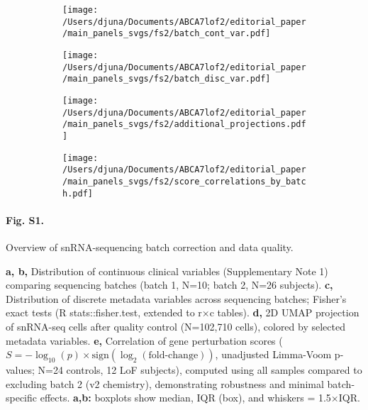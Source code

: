 % 
% 
\begin{figure}[H]
    \begin{subfigure}[t]{\textwidth}
        \caption{}
        \texttt{[image: /Users/djuna/Documents/ABCA7lof2/editorial\_paper/main\_panels\_svgs/fs2/batch\_cont\_var.pdf]}        
    \end{subfigure}
    \begin{subfigure}[t]{\textwidth}
        \caption{}
        \texttt{[image: /Users/djuna/Documents/ABCA7lof2/editorial\_paper/main\_panels\_svgs/fs2/batch\_disc\_var.pdf]}        
    \end{subfigure}  
    \begin{subfigure}[t]{\textwidth}
        \caption{}
        \texttt{[image: /Users/djuna/Documents/ABCA7lof2/editorial\_paper/main\_panels\_svgs/fs2/additional\_projections.pdf]}        
    \end{subfigure}   
    \begin{subfigure}[t]{\textwidth}
        \caption{}
        \texttt{[image: /Users/djuna/Documents/ABCA7lof2/editorial\_paper/main\_panels\_svgs/fs2/score\_correlations\_by\_batch.pdf]}        
    \end{subfigure}   
\end{figure}
\paragraph*{Fig. S1.} Overview of snRNA-sequencing batch correction and data quality.
{}
\textbf{a, b,} Distribution of continuous clinical variables (Supplementary Note 1) comparing sequencing batches (batch 1, N=10; batch 2, N=26 subjects). \textbf{c,} Distribution of discrete metadata variables across sequencing batches; Fisher’s exact tests (R stats::fisher.test, extended to r×c tables). \textbf{d,} 2D UMAP projection of snRNA-seq cells after quality control (N=102,710 cells), colored by selected metadata variables. \textbf{e,} Correlation of gene perturbation scores ($S = -\log_{10}(p)\times\text{sign}(\log_2(\text{fold-change}))$, unadjusted Limma-Voom p-values; N=24 controls, 12 LoF subjects), computed using all samples compared to excluding batch 2 (v2 chemistry), demonstrating robustness and minimal batch-specific effects. \textbf{a,b:} boxplots show median, IQR (box), and whiskers = 1.5×IQR.